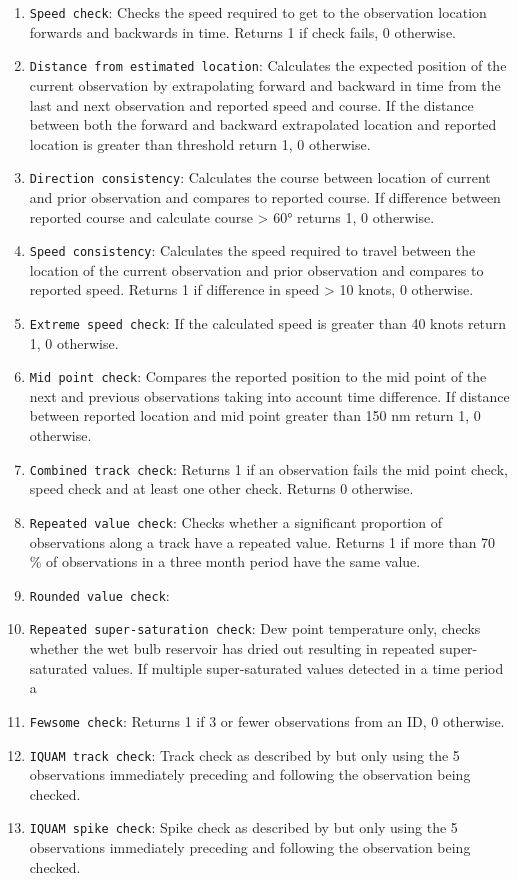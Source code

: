 \begin{enumerate}[resume]
\item \texttt{Speed check}: Checks the speed required to get to the observation location forwards and backwards in time. Returns 1 if check fails, 0 otherwise.
\item \texttt{Distance from estimated location}: Calculates the expected position of the current observation by extrapolating forward and backward in time from the last and next observation and reported speed and course. If the distance between both the forward and backward extrapolated location and reported location is greater than threshold return 1, 0 otherwise.
\item \texttt{Direction consistency}: Calculates the course between location of current and prior observation and compares to reported course. If difference between reported course and calculate course > 60° returns 1, 0 otherwise.
\item \texttt{Speed consistency}: Calculates the speed required to travel between the location of the current observation and prior observation and compares to reported speed. Returns 1 if difference in speed > 10 knots, 0 otherwise.
\item \texttt{Extreme speed check}: If the calculated speed is greater than 40 knots return 1, 0 otherwise.
\item \texttt{Mid point check}: Compares the reported position to the mid point of the next and previous observations taking into account time difference. If distance between reported location and mid point greater than 150 nm return 1, 0 otherwise.
\item \texttt{Combined track check}: Returns 1 if an observation fails the mid point check, speed check and at least one other check. Returns 0 otherwise.
\item \texttt{Repeated value check}: Checks whether a significant proportion of observations along a track have a repeated value. Returns 1 if more than 70 \% of observations in a three month period have the same value.
\item \texttt{Rounded value check}: 
\item \texttt{Repeated super-saturation check}: Dew point temperature only, checks whether the wet bulb reservoir has dried out resulting in repeated super-saturated values. If multiple super-saturated values detected in a time period a
\item \texttt{Fewsome check}: Returns 1 if 3 or fewer observations from an ID, 0 otherwise.
\item \texttt{IQUAM track check}: Track check as described by \cite{Xu2014} but only using the 5 observations immediately preceding and following the observation being checked. 
\item \texttt{IQUAM spike check}: Spike check as described by \cite{Xu2014} but only using the 5 observations immediately preceding and following the observation being checked. 
\end{enumerate}

